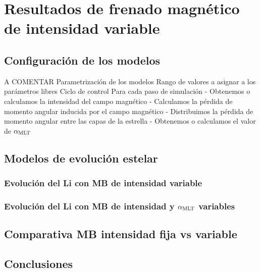 

\chapter{Resultados de frenado magnético de intensidad variable}\label{ch:septimo-capitulo}
\section{Configuración de los modelos} \label{marco_teorico}
A COMENTAR
Parametrización de los modelos
Rango de valores a asignar a los parámetros libres
Ciclo de control
Para cada paso de simulación
- Obtenemos o calculamos la intensidad del campo magnético
- Calculamos la pérdida de momento angular inducida por el campo magnético
- Distribuimos la pérdida de momento angular entre las capas de la estrella
- Obtenemos o calculamos el valor de $\alpha_{\mathrm{MLT}}$


\section{Modelos de evolución estelar}
\subsection{Evolución del Li con MB de intensidad variable}
\subsection{Evolución del Li con MB de intensidad y $\alpha_{\mathrm{MLT}}$ variables}
\section{Comparativa MB intensidad fija vs variable}
\section{Conclusiones}

\endinput

